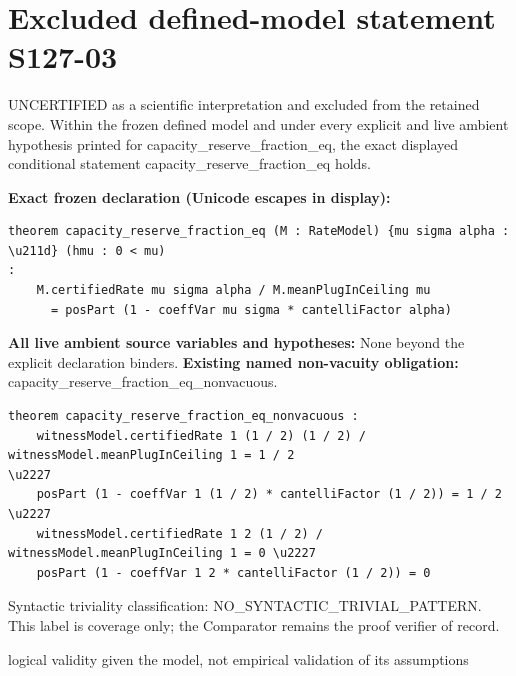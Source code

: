 \documentclass[11pt]{article}
\begin{document}
\section*{Excluded defined-model statement S127-03}
UNCERTIFIED as a scientific interpretation and excluded from the retained scope. Within the frozen defined model and under every explicit and live ambient hypothesis printed for capacity\_\allowbreak{}reserve\_\allowbreak{}fraction\_\allowbreak{}eq, the exact displayed conditional statement capacity\_\allowbreak{}reserve\_\allowbreak{}fraction\_\allowbreak{}eq holds.
\par\noindent\textbf{Exact frozen declaration (Unicode escapes in display):}
\begin{Verbatim}[breaklines=true,breakanywhere=true,fontsize=\scriptsize]
theorem capacity_reserve_fraction_eq (M : RateModel) {mu sigma alpha : \u211d} (hmu : 0 < mu)
:
    M.certifiedRate mu sigma alpha / M.meanPlugInCeiling mu
      = posPart (1 - coeffVar mu sigma * cantelliFactor alpha)
\end{Verbatim}
\noindent\textbf{All live ambient source variables and hypotheses:}
None beyond the explicit declaration binders.
\noindent\textbf{Existing named non-vacuity obligation:} capacity\_\allowbreak{}reserve\_\allowbreak{}fraction\_\allowbreak{}eq\_\allowbreak{}nonvacuous.
\begin{Verbatim}[breaklines=true,breakanywhere=true,fontsize=\scriptsize]
theorem capacity_reserve_fraction_eq_nonvacuous :
    witnessModel.certifiedRate 1 (1 / 2) (1 / 2) / witnessModel.meanPlugInCeiling 1 = 1 / 2
\u2227
    posPart (1 - coeffVar 1 (1 / 2) * cantelliFactor (1 / 2)) = 1 / 2 \u2227
    witnessModel.certifiedRate 1 2 (1 / 2) / witnessModel.meanPlugInCeiling 1 = 0 \u2227
    posPart (1 - coeffVar 1 2 * cantelliFactor (1 / 2)) = 0
\end{Verbatim}
\noindent Syntactic triviality classification: NO\_\allowbreak{}SYNTACTIC\_\allowbreak{}TRIVIAL\_\allowbreak{}PATTERN. This label is coverage only; the Comparator remains the proof verifier of record.
\par\noindent logical validity given the model, not empirical validation of its assumptions
\end{document}
